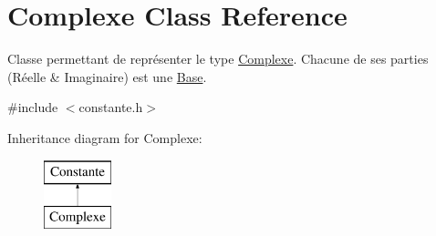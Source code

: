 \hypertarget{class_complexe}{\section{Complexe Class Reference}
\label{class_complexe}
}


Classe permettant de représenter le type \hyperlink{class_complexe}{Complexe}. Chacune de ses parties (Réelle \& Imaginaire) est une \hyperlink{class_base}{Base}.  




{\ttfamily \#include $<$constante.\-h$>$}

Inheritance diagram for Complexe\-:\begin{figure}[H]
\begin{center}
\leavevmode
\includegraphics[height=2.000000cm]{class_complexe}
\end{center}
\end{figure}
